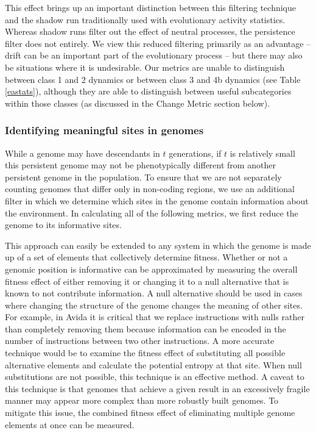 \documentclass[letterpaper]{article}
\begin{document}
This effect brings up an important distinction between this filtering technique and the shadow run traditionally used with evolutionary activity statistics. Whereas shadow runs filter out the effect of neutral processes, the persistence filter does not entirely. We view this reduced filtering primarily as an advantage -- drift can be an important part of the evolutionary process -- but there may also be situations where it is undesirable. Our metrics are unable to distinguish between class 1 and 2 dynamics or between class 3 and 4b dynamics (see Table \ref{eastats}), although they are able to distinguish between useful subcategories within those classes (as discussed in the Change Metric section below).

\subsubsection{Identifying meaningful sites in genomes}
While a genome may have descendants in $t$ generations, if $t$ is relatively small this persistent genome may not be phenotypically different from another persistent genome in the population. To ensure that we are not separately counting genomes that differ only in non-coding regions, we use an additional filter in which we determine which sites in the genome contain information about the environment. In calculating all of the following metrics, we first reduce the genome to its informative sites.
    
This approach can easily be extended to any system in which the genome is made up of a set of elements that collectively determine fitness. Whether or not a genomic position is informative can be approximated by measuring the overall fitness effect of either removing it or changing it to a null alternative that is known to not contribute information. A null alternative should be used in cases where changing the structure of the genome changes the meaning of other sites. For example, in Avida it is critical that we replace instructions with nulls rather than completely removing them because information can be encoded in the number of instructions between two other instructions. A more accurate technique would be to examine the fitness effect of substituting all possible alternative elements and calculate the potential entropy at that site. When null substitutions are not possible, this technique is an effective method. A caveat to this technique is that genomes that achieve a given result in an excessively fragile manner may appear more complex than more robustly built genomes. To mitigate this issue, the combined fitness effect of eliminating multiple genome elements at once can be measured.
\end{document}
